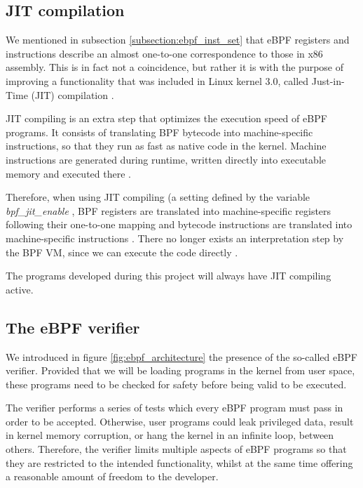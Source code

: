 \subsection{JIT compilation}
We mentioned in subsection \ref{subsection:ebpf_inst_set} that eBPF registers and instructions describe an almost one-to-one correspondence to those in x86 assembly. This is in fact not a coincidence, but rather it is with the purpose of improving a functionality that was included in Linux kernel 3.0, called Just-in-Time (JIT) compilation \cite{ebpf_JIT} \cite{ebpf_JIT_demystify_page13}.

JIT compiling is an extra step that optimizes the execution speed of eBPF programs. It consists of translating BPF bytecode into machine-specific instructions, so that they run as fast as native code in the kernel. Machine instructions are generated during runtime, written directly into executable memory and executed there \cite{ebpf_JIT_demystify_page14}.

Therefore, when using JIT compiling (a setting defined by the variable \textit{bpf\_jit\_enable} \cite{jit_enable_setting}, BPF registers are translated into machine-specific registers following their one-to-one mapping and bytecode instructions are translated into machine-specific instructions \cite{ebpf_starovo_slides_page23}. There no longer exists an interpretation step by the BPF VM, since we can execute the code directly \cite{brendan_gregg_bpf_book_bpf_vm}.

The programs developed during this project will always have JIT compiling active.


\subsection{The eBPF verifier} \label{subsection:ebpf_verifier}
We introduced in figure \ref{fig:ebpf_architecture} the presence of the so-called eBPF verifier. Provided that we will be loading programs in the kernel from user space, these programs need to be checked for safety before being valid to be executed.

The verifier performs a series of tests which every eBPF program must pass in order to be accepted. Otherwise, user programs could leak privileged data, result in kernel memory corruption, or hang the kernel in an infinite loop, between others. Therefore, the verifier limits multiple aspects of eBPF programs so that they are restricted to the intended functionality, whilst at the same time offering a reasonable amount of freedom to the developer.

